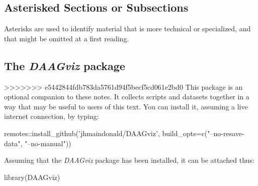 \subsection*{Asterisked Sections or Subsections}

Asterisks are used to identify material that is more technical or
specialized, and that might be omitted at a first reading.

\subsection*{The {\em DAAGviz} package}

>>>>>>> e5442844fdb783da5761d94f5becf5cd061e2bd0
This package is an optional companion to these notes. 
It collects scripts and datasets together in a way that may be
useful to users of this text.  
You can install it, assuming a live internet connection,
by typing:

\begin{fullwidth}

\begin{Schunk}
\begin{Sinput}
remotes::install_github('jhmaindonald/DAAGviz',
                        build_opts=c("--no-resave-data", 
                                     "--no-manual"))
\end{Sinput}
\end{Schunk}

\end{fullwidth}

Assuming that the {\em DAAGviz} package has been installed, it can be attached thus:
\begin{Schunk}
\begin{Sinput}
library(DAAGviz)
\end{Sinput}
\end{Schunk}

